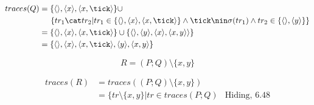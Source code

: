 \documentclass{scrreprt}
\begin{document}
\begin{align*}
  traces(Q) &= \{ \langle \rangle, \langle x \rangle, \langle x, \tick \rangle \} \cup \\
            &\hspace{0.5cm} \{ tr_1 \cat tr_2 | tr_1 \in \{ \langle \rangle, \langle x \rangle, \langle x, \tick \rangle \} \wedge \tick \nin \sigma(tr_1) \wedge tr_2 \in \{ \langle \rangle, \langle y \rangle \} \} \\
            &= \{ \langle \rangle, \langle x \rangle, \langle x, \tick \rangle \} \cup \{ \langle \rangle, \langle y \rangle, \langle x \rangle, \langle x, y \rangle \rangle \} \\
            &= \{ \langle \rangle, \langle x \rangle, \langle x, \tick \rangle, \langle y \rangle, \langle x, y \rangle \}
\end{align*}

\newpage

\begin{equation*}
  R = (P; Q) \setminus \{ x, y \}
\end{equation*}

\begin{align*}
  traces(R) &= traces((P; Q) \setminus \{ x, y \}) \\
            &= \{ tr \setminus \{ x, y \} | tr \in traces(P; Q) & \text{Hiding, 6.48}
\end{align*}
\end{document}
